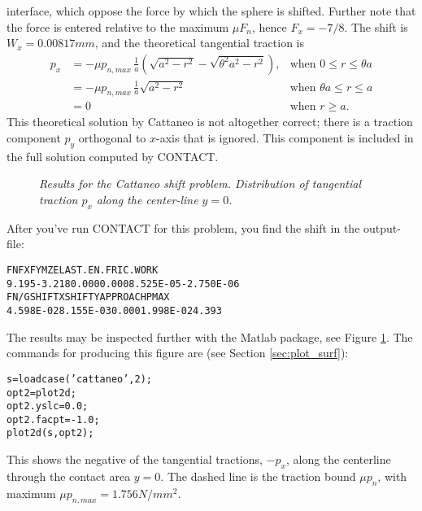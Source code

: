 \documentclass[12pt]{report}
\begin{document}
interface, which oppose the force by which the sphere is shifted. Further
note that the force is entered relative to the maximum $\mu F_n$,
hence $F_x=-7/8$. The shift is $W_x=0.00817\unit{mm}$, and the theoretical
tangential traction is
\begin{equation}
\begin{array}{rll}
 p_x &= -\mu p_{n,max} \, \frac{1}{a} \left( \sqrt{a^2-r^2} - 
                \sqrt{\theta^2 a^2-r^2} \right), &
                \mbox{when } 0 \le r \le \theta a \\[0.5ex]
     &= -\mu p_{n,max} \, \frac{1}{a} \sqrt{a^2-r^2} &
                \mbox{when } \theta a \le r \le a \\[0.5ex]
     &= 0 & \mbox{when } r \ge a.
\end{array}
\end{equation}
This theoretical solution by Cattaneo is not altogether correct; there is a
traction component $p_y$ orthogonal to $x$-axis that is ignored. This
component is included in the full solution computed by CONTACT.

\begin{figure}[bt]
\centering
{}
\caption{\em Results for the Cattaneo shift problem. Distribution of
tangential traction $p_x$ along the center-line $y=0$.}
\label{fig:cattaneo_px_y0}
\end{figure}

After you've run CONTACT for this problem, you find the shift in the
output-file:
\begin{alltt}\small
     FN          FX          FY          MZ         ELAST.EN.   FRIC.WORK
         9.195      -3.218       0.000       0.000   8.525E-05  -2.750E-06
     FN/G       SHIFT X      SHIFT Y     APPROACH     PMAX    
     4.598E-02   8.155E-03       0.000   1.998E-02       4.393
\end{alltt}
The results may be inspected further with the Matlab package, see Figure
\ref{fig:cattaneo_px_y0}. The commands for producing this figure are
(see Section \ref{sec:plot_surf}):
\begin{alltt}\small
  s = loadcase('cattaneo',2); % the tangential problem concerns the
  opt2 = plot2d;              % second case in the actual input-file
  opt2.yslc = 0.0;
  opt2.facpt = -1.0;
  plot2d(s, opt2);
\end{alltt}
This shows the negative of the tangential tractions, $-p_x$, along the
centerline through the contact area $y=0$. The dashed line is the traction
bound $\mu p_n$, with maximum $\mu p_{n,max}=1.756\unit{N/mm^2}$.
\end{document}
